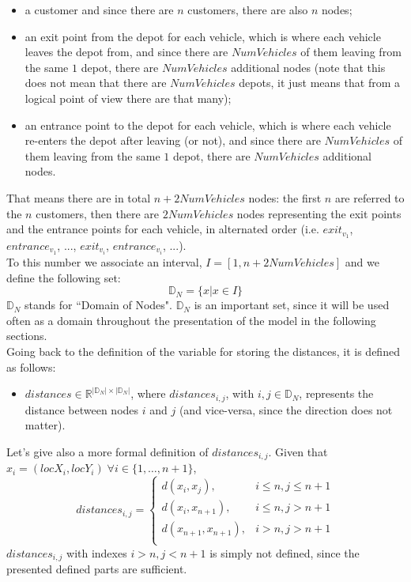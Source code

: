 \documentclass[../main.tex]{subfiles}
\begin{document}
\begin{itemize}
    \item a customer and since there are $n$ customers, there are also $n$ nodes;
    \item an exit point from the depot for each vehicle, which is where each vehicle leaves the depot from, and since there are $NumVehicles$ of them leaving from the same $1$ depot, there are $NumVehicles$ additional nodes (note that this does not mean that there are $NumVehicles$ depots, it just means that from a logical point of view there are that many);
    \item an entrance point to the depot for each vehicle, which is where each vehicle re-enters the depot after leaving (or not), and since there are $NumVehicles$ of them leaving from the same $1$ depot, there are $NumVehicles$ additional nodes.
\end{itemize}
That means there are in total $n + 2NumVehicles$ nodes: the first $n$ are referred to the $n$ customers, then there are $2NumVehicles$ nodes representing the exit points and the entrance points for each vehicle, in alternated order (i.e. $exit_{v_1}$, $entrance_{v_1}$, ..., $exit_{v_i}$, $entrance_{v_i}$, ...).\\
To this number we associate an interval, $I = [1, n + 2NumVehicles]$ and we define the following set: $$\mathbb{D}_N = \{x | x \in I\}$$
$\mathbb{D}_N$ stands for ``Domain of Nodes".
$\mathbb{D}_N$ is an important set, since it will be used often as a domain throughout the presentation of the model in the following sections.\\
Going back to the definition of the variable for storing the distances, it is defined as follows:
\begin{itemize}
    \item $distances \in \mathbb{R}^{|\mathbb{D}_N|\times{}|\mathbb{D}_N|}$, where $distances_{i,j}$, with $i,j \in \mathbb{D}_N$, represents the distance between nodes $i$ and $j$ (and vice-versa, since the direction does not matter).
\end{itemize}
Let's give also a more formal definition of $distances_{i,j}$. Given that $x_i = (locX_i, locY_i) \; \forall i \in \{1,\dots,n+1\}$,
$$distances_{i,j} = {
    \begin{cases}
        d(x_i, x_j), & \text{$i \leq n, j \leq n+1$} \\
        d(x_i, x_{n+1}), & \text{$i \leq n, j > n+1$} \\
        d(x_{n+1}, x_{n+1}), & \text{$i > n, j > n+1$} \\
    \end{cases}
}$$
$distances_{i,j}$ with indexes $i > n, j < n+1$ is simply not defined, since the presented defined parts are sufficient.
\end{document}
